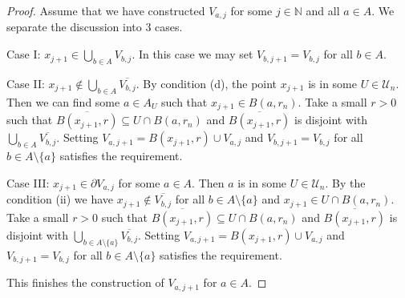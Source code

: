 \documentclass[10pt,a4paper]{amsart}
\newcommand{\Nb}{{\mathbb N}}
\newcommand{\cU}{{\mathcal U}}
\begin{document}
\begin{proof}
Assume that we have constructed $V_{a, j}$ for some $j\in \Nb$ and all $a\in A$. 
We separate the discussion into 3 cases. 

Case I: $x_{j+1}\in \bigcup_{b\in A} V_{b, j}$. In this case we may set $V_{b, j+1}=V_{b, j}$ for all $b\in A$. 

Case II: $x_{j+1}\not\in \bigcup_{b\in A} \overline{V_{b, j}}$. By condition (d), the point $x_{j+1}$ is in some $U\in \cU_n$. Then we can find some $a\in A_U$ such that $x_{j+1}\in B(a, r_n)$. Take a small $r>0$ such that  $\overline{B(x_{j+1}, r)}\subseteq U\cap B(a, r_n)$ and 
$\overline{B(x_{j+1}, r)}$ is disjoint with $\bigcup_{b\in A} \overline{V_{b, j}}$. Setting $V_{a, j+1}=B(x_{j+1}, r)\cup V_{a, j}$ and $V_{b, j+1}=V_{b, j}$ for all $b\in A\setminus \{a\}$ satisfies the requirement. 

Case III: $x_{j+1}\in \partial V_{a, j}$ for some $a\in A$. Then $a$ is in some $U\in \cU_n$. By the condition (ii) we have $x_{j+1}\not\in \overline{V_{b, j}}$ for all $b\in A\setminus \{a\}$ and $x_{j+1}\in U\cap B(a, r_n)$. Take a small $r>0$ such that  $\overline{B(x_{j+1}, r)}\subseteq U\cap B(a, r_n)$ and 
$\overline{B(x_{j+1}, r)}$ is disjoint with $\bigcup_{b\in A\setminus \{a\}} \overline{V_{b, j}}$. Setting $V_{a, j+1}=B(x_{j+1}, r)\cup V_{a, j}$ and $V_{b, j+1}=V_{b, j}$ for all $b\in A\setminus \{a\}$ satisfies the requirement. 

This finishes the construction of $V_{a, j+1}$ for $a\in A$.
\end{proof}
\end{document}

